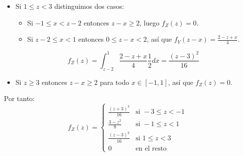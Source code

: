 \begin{example}
\begin{itemize}
        \item Si $1 \leq z < 3$ distinguimos dos casos:
              \begin{itemize}
                  \item Si $-1 \leq x < z-2$ entonces $z-x \geq 2$, luego $f_Z(z) = 0$.
                  \item Si $z-2 \leq x < 1$ entonces $0 \leq z-x < 2$, así que $f_Y(z-x) = \frac{2-z+x}{4}$.
              \end{itemize}
              $$f_Z(z) = \int_{z-2}^1 \frac{2-z+x}{4} \frac{1}{2} dx = \frac{(z-3)^2}{16}$$
        \item Si $z \geq 3$ entonces $z-x \geq 2$ para todo $x \in [-1, 1]$, así que $f_Z(z) = 0$.
    \end{itemize}
    Por tanto:
    $$f_Z(z) = \begin{cases}
            \frac{(z+3)^2}{16} & \text{si } -3 \leq z < -1 \\
            \frac{3-z^2}{8}    & \text{si } -1 \leq z < 1  \\
            \frac{(z-3)^2}{16} & \text{si } 1 \leq z < 3   \\
            0                  & \text{en el resto}
        \end{cases}$$
\end{example}

